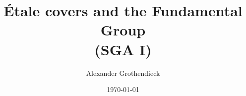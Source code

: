 \documentclass{amsbook}
\title{Étale covers and the Fundamental Group\\(SGA I)}
\author{Alexander Grothendieck}
\date{\today}
\begin{document}
\maketitle






\tableofcontents{}














\end{document}
